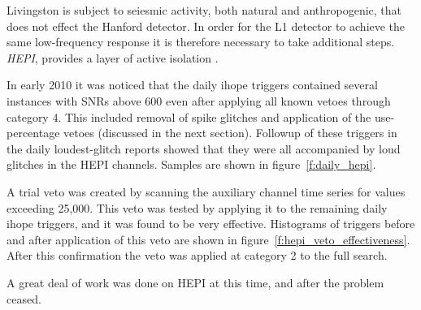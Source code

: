 
Livingston is subject to seiesmic activity, both natural and
anthropogenic, that does not effect the Hanford detector.  In order
for the L1 detector to achieve the same low-frequency response it is
therefore necessary to take additional steps.  \emph{HEPI}, provides a
layer of active isolation .

In early 2010 it was noticed that the daily ihope triggers contained
several instances with SNRs above 600 even after applying all known
vetoes through category 4.  This included removal of spike glitches
and application of the use-percentage vetoes (discussed in the next
section).  Followup of these triggers in the daily loudest-glitch
reports showed that they were all accompanied by loud glitches in the
HEPI channels.  Samples are shown in figure~\ref{f:daily_hepi}.

A trial veto was created by scanning the auxiliary channel time series
for values exceeding 25,000.  This veto was tested by applying it to
the remaining daily ihope triggers, and it was found to be very
effective.  Histograms of triggers before and after application of
this veto are shown in figure~\ref{f:hepi_veto_effectiveness}.  After
this confirmation the veto was applied at category 2 to the full
search.

A great deal of work was done on HEPI at this time, and after
 the problem ceased.

%
%
%


